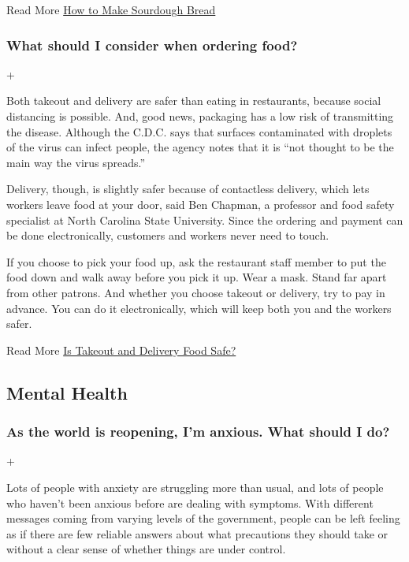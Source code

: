  Read More
\href{https://cooking.nytimes.com/guides/59-how-to-make-sourdough-bread}{How
to Make Sourdough Bread}

\hypertarget{what-should-i-consider-when-ordering-food}{%
\subsubsection{What should I consider when ordering
food?}\label{what-should-i-consider-when-ordering-food}}

+

Both takeout and delivery are safer than eating in restaurants, because
social distancing is possible. And, good news, packaging has a low risk
of transmitting the disease. Although the C.D.C. says that surfaces
contaminated with droplets of the virus can infect people, the agency
notes that it is ``not thought to be the main way the virus spreads.''

Delivery, though, is slightly safer because of contactless delivery,
which lets workers leave food at your door, said Ben Chapman, a
professor and food safety specialist at North Carolina State University.
Since the ordering and payment can be done electronically, customers and
workers never need to touch.

If you choose to pick your food up, ask the restaurant staff member to
put the food down and walk away before you pick it up. Wear a mask.
Stand far apart from other patrons. And whether you choose takeout or
delivery, try to pay in advance. You can do it electronically, which
will keep both you and the workers safer.

 Read More
\href{https://www.nytimes.com/2020/05/27/dining/takeout-delivery-safety-coronavirus.html}{Is
Takeout and Delivery Food Safe?}

\hypertarget{mental-health}{%
\subsection{Mental Health}\label{mental-health}}

\hypertarget{as-the-world-is-reopening-im-anxious-what-should-i-do}{%
\subsubsection{As the world is reopening, I'm anxious. What should I
do?}\label{as-the-world-is-reopening-im-anxious-what-should-i-do}}

+

Lots of people with anxiety are struggling more than usual, and lots of
people who haven't been anxious before are dealing with symptoms. With
different messages coming from varying levels of the government, people
can be left feeling as if there are few reliable answers about what
precautions they should take or without a clear sense of whether things
are under control.

